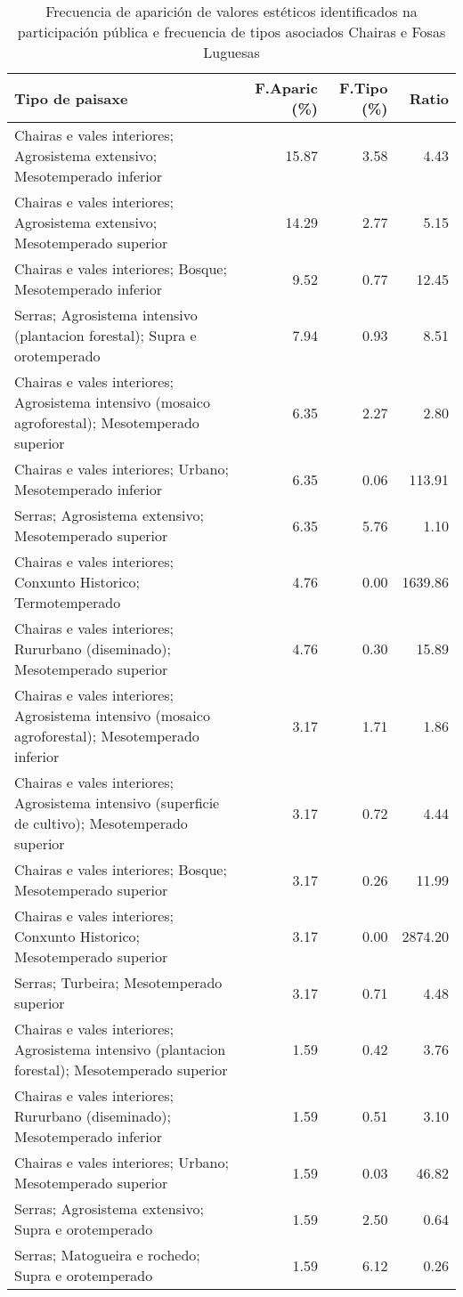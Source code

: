 \begin{table}[p]
\centering
\caption{Frecuencia de aparición de valores estéticos identificados na participación pública e frecuencia de tipos asociados Chairas e Fosas Luguesas} 
\label{vsixotest6}
\begin{tabular}{lrrr}
  \hline
Tipo de paisaxe & F.Aparic (\%) & F.Tipo (\%) & Ratio \\ 
  \hline
Chairas e vales interiores; Agrosistema extensivo; Mesotemperado inferior & 15.87 & 3.58 & 4.43 \\ 
  Chairas e vales interiores; Agrosistema extensivo; Mesotemperado superior & 14.29 & 2.77 & 5.15 \\ 
  Chairas e vales interiores; Bosque; Mesotemperado inferior & 9.52 & 0.77 & 12.45 \\ 
  Serras; Agrosistema intensivo (plantacion forestal); Supra e orotemperado & 7.94 & 0.93 & 8.51 \\ 
  Chairas e vales interiores; Agrosistema intensivo (mosaico agroforestal); Mesotemperado superior & 6.35 & 2.27 & 2.80 \\ 
  Chairas e vales interiores; Urbano; Mesotemperado inferior & 6.35 & 0.06 & 113.91 \\ 
  Serras; Agrosistema extensivo; Mesotemperado superior & 6.35 & 5.76 & 1.10 \\ 
  Chairas e vales interiores; Conxunto Historico; Termotemperado & 4.76 & 0.00 & 1639.86 \\ 
  Chairas e vales interiores; Rururbano (diseminado); Mesotemperado superior & 4.76 & 0.30 & 15.89 \\ 
  Chairas e vales interiores; Agrosistema intensivo (mosaico agroforestal); Mesotemperado inferior & 3.17 & 1.71 & 1.86 \\ 
  Chairas e vales interiores; Agrosistema intensivo (superficie de cultivo); Mesotemperado superior & 3.17 & 0.72 & 4.44 \\ 
  Chairas e vales interiores; Bosque; Mesotemperado superior & 3.17 & 0.26 & 11.99 \\ 
  Chairas e vales interiores; Conxunto Historico; Mesotemperado superior & 3.17 & 0.00 & 2874.20 \\ 
  Serras; Turbeira; Mesotemperado superior & 3.17 & 0.71 & 4.48 \\ 
  Chairas e vales interiores; Agrosistema intensivo (plantacion forestal); Mesotemperado superior & 1.59 & 0.42 & 3.76 \\ 
  Chairas e vales interiores; Rururbano (diseminado); Mesotemperado inferior & 1.59 & 0.51 & 3.10 \\ 
  Chairas e vales interiores; Urbano; Mesotemperado superior & 1.59 & 0.03 & 46.82 \\ 
  Serras; Agrosistema extensivo; Supra e orotemperado & 1.59 & 2.50 & 0.64 \\ 
  Serras; Matogueira e rochedo; Supra e orotemperado & 1.59 & 6.12 & 0.26 \\ 
   \hline
\end{tabular}
\end{table}
